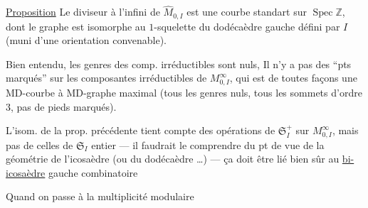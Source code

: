 \uline{Proposition} Le diviseur à l'infini  de $\widehat M_{0,I}$ est une courbe standart  sur $\operatorname{Spec}\mathbb Z$, dont le graphe est isomorphe au  $1$-squelette du dodécaèdre gauche défini par $I$ (muni d'une orientation convenable).

Bien entendu, les genres des comp. irréductibles sont nuls, Il n'y a pas  des ``pts marqués'' sur  les  composantes irréductibles de $M^\infty_{0,I}$, qui est de toutes façons une MD-courbe  à MD-graphe maximal (tous les genres nuls, tous les sommets d'ordre $3$, pas de pieds marqués).

L'isom. de la prop. précédente tient compte des opérations de $\mathfrak S_I^+$  sur $M^\infty_{0,I}$, mais pas de celles de $\mathfrak S_I$  entier --- il faudrait le comprendre du pt de vue de la géométrie de l'icosaèdre  (ou du dodécaèdre \ldots) --- ça doit être lié bien sûr au \uline{bi-icosaèdre} gauche combinatoire\unsure{)|]}

Quand on passe à la multiplicité modulaire
